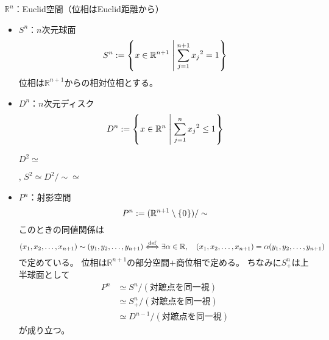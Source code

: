 \documentclass[uplatex]{jsarticle}
\begin{document}
\sukima {}

$\mathbb{R}^{n}$：Euclid空間（位相はEuclid距離から）

\begin{itemize}
  \vspace{-0.5\baselineskip}
  \item $S^{n}$：$n$次元球面
  \begin{equation}
    S^{n} := \Set{\hspace{-1.8pt} x \in \mathbb{R}^{n+1} | \sum_{j=1}^{n+1} {x_{j}}^{2} = 1 \hspace{-1.8pt}}
  \end{equation}
  位相は$\mathbb{R}^{n+1}$からの相対位相とする。

  \item $D^{n}$：$n$次元ディスク
  \begin{equation}
    D^{n} := \Set{\hspace{-1.8pt} x \in \mathbb{R}^{n} | \sum_{j=1}^{n} {x_{j}}^{2} \le 1 \hspace{-1.8pt}}
  \end{equation}

  \begin{center}
    $D^{2} \simeq$
      , \quad $S^{2} \simeq {D^{2} / \sim} \simeq$
  \end{center}

  \item $P^{n}$：射影空間
  \begin{equation}
    P^{n} := (\mathbb{R}^{n+1} \setminus \Set{\hspace{-1.8pt} 0 \hspace{-1.8pt}}) / \sim
  \end{equation}
  このときの同値関係は
  \begin{equation}
    (x_{1},x_{2},\dots,x_{n+1}) \sim (y_{1},y_{2},\dots,y_{n+1}) \overset{\mathrm{def}}{\Longleftrightarrow} \exists \alpha \in \mathbb{R}, \quad (x_{1},x_{2},\dots,x_{n+1}) = \alpha (y_{1},y_{2},\dots,y_{n+1})
  \end{equation}
  で定めている。
  位相は$\mathbb{R}^{n+1}$の部分空間$+$商位相で定める。
  ちなみに$S_{+}^{n}$は上半球面として
  \begin{align}
    P^{n} &\simeq S^{n} / (\text{対蹠点を同一視}) \\
    &\simeq S_{+}^{n} / (\text{対蹠点を同一視}) \\
    &\simeq D^{n-1} / (\text{対蹠点を同一視})
  \end{align}
  が成り立つ。
  

\end{itemize}
\end{document}
